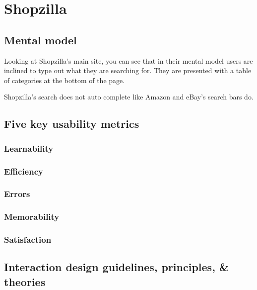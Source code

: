 \documentclass[11pt, oneside]{article}
\begin{document}
\pagebreak

\section{Shopzilla}

\subsection{Mental model}

Looking at Shopzilla's main site, you can see that in their mental model users are inclined to type out what they are searching for. They are presented with a table of categories at the bottom of the page.

Shopzilla's search does not auto complete like Amazon and eBay's search bars do.

\subsection{Five key usability metrics}
\subsubsection{Learnability}
\subsubsection{Efficiency}
\subsubsection{Errors}
\subsubsection{Memorability}
\subsubsection{Satisfaction}

\subsection{Interaction design guidelines, principles, \& theories}
\end{document}
